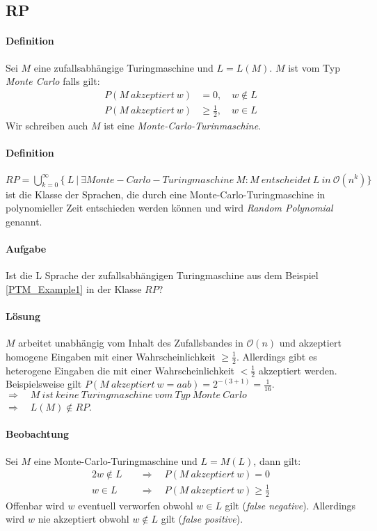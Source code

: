 \subsection{RP}
\paragraph{Definition}
Sei $M$ eine zufallsabhängige Turingmaschine und $L = L(M)$. $M$ ist vom Typ \emph{Monte Carlo} falls gilt:
\begin{align*}
	P(M\ akzeptiert\ w) & = 0,\quad w \notin L \\
	P(M\ akzeptiert\ w) & \geq \frac{1}{2},\quad w \in L
\end{align*}
Wir schreiben auch $M$ ist eine \emph{Monte-Carlo-Turinmaschine}.

\paragraph{Definition}
$RP = \bigcup\limits_{k=0}^{\infty} \bigl\{\ L\ \bigl\lvert\ \exists Monte-Carlo-Turingmaschine\ M : M\ entscheidet\ L\ in\ \mathcal{O}(n^k) \bigl\}$ ist die Klasse der Sprachen, die durch eine Monte-Carlo-Turingmaschine in polynomieller Zeit entschieden werden können und wird \emph{Random Polynomial} genannt.

\paragraph{Aufgabe}
Ist die L Sprache der zufallsabhängigen Turingmaschine aus dem Beispiel \ref{PTM_Example1} in der Klasse $RP$?

\paragraph{Lösung}
$M$ arbeitet unabhängig vom Inhalt des Zufallsbandes in $\mathcal{O}(n)$ und akzeptiert homogene Eingaben mit einer Wahrscheinlichkeit $\geq \frac{1}{2}$.
Allerdings gibt es heterogene Eingaben die mit einer Wahrscheinlichkeit $< \frac{1}{2}$ akzeptiert werden.
Beispielsweise gilt $P(M\ akzeptiert\ w=aab) = 2^{-(3+1)} = \frac{1}{16}$. \\
$\Rightarrow \quad M\ ist\ keine\ Turingmaschine\ vom\ Typ\ Monte\ Carlo$ \\
$\Rightarrow \quad L(M) \notin RP$.

\paragraph{Beobachtung}
Sei $M$ eine Monte-Carlo-Turingmaschine und $L = M(L)$, dann gilt:
\begin{alignat}{2}
	w \notin L \quad & \Rightarrow \quad P(M\ akzeptiert\ w) = 0 \\
	w \in L \quad & \Rightarrow \quad P(M\ akzeptiert\ w) \geq \frac{1}{2}
\end{alignat}
Offenbar wird $w$ eventuell verworfen obwohl $w \in L$ gilt (\emph{false negative}).
Allerdings wird $w$ nie akzeptiert obwohl $w \notin L$ gilt (\emph{false positive}).

